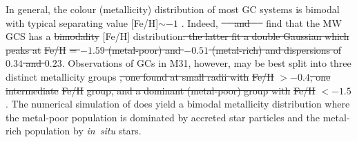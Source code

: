\documentclass[a4paper,fleqn,usenatbib]{mnras}
\providecommand{\DIFadd}[1]{{\protect\color{blue}\uwave{#1}}} %
\providecommand{\DIFdel}[1]{{\protect\color{red}\sout{#1}}}                      %
\providecommand{\DIFaddbegin}{} %
\providecommand{\DIFaddend}{} %
\providecommand{\DIFdelbegin}{} %
\providecommand{\DIFdelend}{} %
\newcommand{\DIFscaledelfig}{0.5}
\newlength{\DIFdelgraphicswidth} %
\newlength{\DIFdelgraphicsheight} %
\newcommand{\DIFaddincludegraphics}[2][]{{\color{blue}\fbox{\DIFOincludegraphics[#1]{#2}}}} %
\newcommand{\DIFdelincludegraphics}[2][]{%
\sbox{\DIFdelgraphicsbox}{\DIFOincludegraphics[#1]{#2}}%
\settoboxwidth{\DIFdelgraphicswidth}{\DIFdelgraphicsbox} %
\settoboxtotalheight{\DIFdelgraphicsheight}{\DIFdelgraphicsbox} %
\scalebox{\DIFscaledelfig}{%
\parbox[b]{\DIFdelgraphicswidth}{\usebox{\DIFdelgraphicsbox}\\[-\baselineskip] \rule{\DIFdelgraphicswidth}{0em}}\llap{\resizebox{\DIFdelgraphicswidth}{\DIFdelgraphicsheight}{%
\setlength{\unitlength}{\DIFdelgraphicswidth}%
\begin{picture}(1,1)%
\thicklines\linethickness{2pt} %
{\color[rgb]{1,0,0}\put(0,0){\framebox(1,1){}}}%
{\color[rgb]{1,0,0}\put(0,0){\line( 1,1){1}}}%
{\color[rgb]{1,0,0}\put(0,1){\line(1,-1){1}}}%
\end{picture}%
}\hspace*{3pt}}} %
} %
\DeclareRobustCommand{\DIFaddbegin}{\DIFOaddbegin \let\includegraphics\DIFaddincludegraphics} %
\DeclareRobustCommand{\DIFaddend}{\DIFOaddend \let\includegraphics\DIFOincludegraphics} %
\DeclareRobustCommand{\DIFdelbegin}{\DIFOdelbegin \let\includegraphics\DIFdelincludegraphics} %
\DeclareRobustCommand{\DIFdelend}{\DIFOaddend \let\includegraphics\DIFOincludegraphics} %
\begin{document}
In general, the colour (metallicity) distribution of most GC systems is bimodal 
with typical separating value [Fe/H]$\sim -1$ \citep{1985ApJ...293..424Z,
1999AJ....118.1526G,2001AJ....121.2974L,2006ApJ...639...95P}. Indeed, 
\DIFdelbegin \DIFdel{\mbox{%
\citet[][p. 234]{1998gcs..book.....A} }\hspace{0pt}%
and \mbox{%
\citet[][p. 38]{Harris2001} }\hspace{0pt}%
}\DIFdelend \DIFaddbegin \DIFadd{\mbox{%
\citet{1998gcs..book.....A} }\hspace{0pt}%
and \mbox{%
\citet{Harris2001} }\hspace{0pt}%
}\DIFaddend find that the MW GCS has a 
\DIFdelbegin \DIFdel{bimodality }\DIFdelend \DIFaddbegin \DIFadd{bimodal }\DIFaddend [Fe/H] distribution\DIFdelbegin \DIFdel{: the latter fit a double Gaussian 
which peaks at }%
\DIFdel{Fe/H}%
\DIFdel{= $-1.59$ (metal-poor) and $-0.51$ (metal-rich) and 
dispersions of $0.34$ and $0.23$}\DIFdelend . Observations of GCs in M31, however, may be best 
split into three distinct metallicity groups \DIFdelbegin \DIFdel{, one found at small radii with 
}%
\DIFdel{Fe/H}%
\DIFdel{$>-0.4$, one intermediate }%
\DIFdel{Fe/H}%
\DIFdel{group, and a dominant (metal-poor) group 
with }%
\DIFdel{Fe/H}%
\DIFdel{$< -1.5$ }\DIFdelend \citep{2016ApJ...824...42C}. The 
numerical simulation of \citet{2017MNRAS.465.3622R} does yield a bimodal 
metallicity distribution where the metal-poor population is dominated by accreted 
star particles and the metal-rich population by {\it in~situ} stars. 
\end{document}
